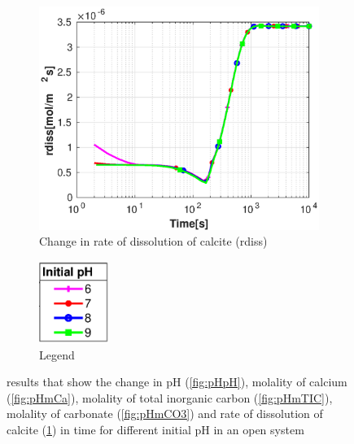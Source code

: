 \begin{figure}[!h]
    \hfill
    \begin{subfigure}{.5\linewidth}
            \centering
        \includegraphics[width=\textwidth]{PICTURES/with_pH_rdiss.eps}
        \caption{Change in rate of dissolution of calcite (rdiss)}
        \label{fig:pHrdiss}
    \end{subfigure}%
  \hfill
  \begin{subfigure}{.5\linewidth}
            \centering
        \includegraphics[width=0.25\textwidth]{PICTURES/with_pH_legend.eps}
        \caption{Legend}
        \label{fig:pHlegend}
    \end{subfigure}%
    \caption{\DuMuX results that show the change in pH (\cref{fig:pHpH}), molality of calcium (\cref{fig:pHmCa}), 
    molality of total inorganic carbon (\cref{fig:pHmTIC}), molality of carbonate (\cref{fig:pHmCO3}) and rate of 
    dissolution of calcite (\cref{fig:pHrdiss}) in time for different initial pH in an open system}
    \label{fig:comparisionDiffInitialpH}
\end{figure} 


